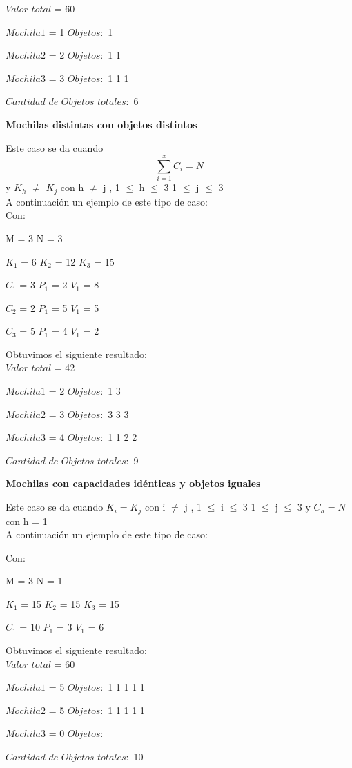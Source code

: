 $Valor$ $total$ = 60

$Mochila1$ = 1 $Objetos:$ 1

$Mochila2$ = 2 $Objetos:$ 1 1

$Mochila3$ = 3 $Objetos:$ 1 1 1

$Cantidad$ $de$ $Objetos$ $totales:$ 6

\begin{center}
 \textbf{Mochilas distintas con objetos distintos}
\end{center}

Este caso se da cuando \[
\sum_{i=1}^{x}C_{i}=N 
\]  y $K_{h}$ $\neq$ $K_{j}$ con h $\neq$ j , 1 $\leq$ h $\leq$ 3  1 $\leq$ j $\leq$ 3 \\

A continuaci\'on un ejemplo de este tipo de caso:\\

 Con:
 
 M = 3 N = 3
 
 $K_{1}$ = 6  $K_{2}$ = 12  $K_{3}$ = 15
 
 $C_{1}$ = 3 $P_{1}$ = 2 $V_{1}$ = 8
 
 $C_{2}$ = 2 $P_{1}$ = 5 $V_{1}$ = 5
 
 $C_{3}$ = 5 $P_{1}$ = 4 $V_{1}$ = 2
  
  \indent  
  
  Obtuvimos el siguiente resultado:\\

$Valor$ $total$ = 42

$Mochila1$ = 2 $Objetos:$ 1 3

$Mochila2$ = 3 $Objetos:$ 3 3 3

$Mochila3$ = 4 $Objetos:$ 1 1 2 2

$Cantidad$ $de$ $Objetos$ $totales:$ 9


\begin{center}
 \textbf{Mochilas con capacidades id\'enticas y objetos iguales}
\end{center}

Este caso se da cuando $K_{i} = K_{j}$ con i $\neq$ j , 1 $\leq$ i $\leq$ 3  1 $\leq$ j $\leq$ 3  y $C_{h} = N$ con h = 1\\

A continuaci\'on un ejemplo de este tipo de caso:

 Con:
 
 M = 3 N = 1
 
 $K_{1}$ = 15  $K_{2}$ = 15  $K_{3}$ = 15
 
 $C_{1}$ = 10 $P_{1}$ = 3 $V_{1}$ = 6
 
  \indent  
  
  Obtuvimos el siguiente resultado:\\

$Valor$ $total$ = 60

$Mochila1$ = 5 $Objetos:$ 1 1 1 1 1

$Mochila2$ = 5 $Objetos:$ 1 1 1 1 1

$Mochila3$ = 0 $Objetos:$ 

$Cantidad$ $de$ $Objetos$ $totales:$ 10